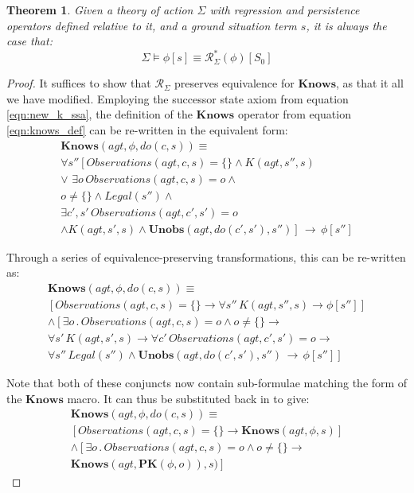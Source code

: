 \documentclass[letterpaper]{article}
\newtheorem{theorem}{Theorem}
\begin{document}
\begin{theorem}

Given a theory of action $\Sigma$ with regression and persistence
operators defined relative to it, and a ground situation term $s$,
it is always the case that:
\begin{equation}
\Sigma\models\phi[s]\equiv\mathcal{R}_{\Sigma}^{*}(\phi)[S_{0}]
\end{equation}

\end{theorem}

\begin{proof}

It suffices to show that $\mathcal{R}_{\Sigma}$ preserves equivalence
for $\mathbf{Knows}$, as that it all we have modified. Employing
the successor state axiom from equation \ref{eqn:new_k_ssa}, the
definition of the $\mathbf{Knows}$ operator from equation \ref{eqn:knows_def}
can be re-written in the equivalent form: \begin{multline*}
\mathbf{Knows}(agt,\phi,do(c,s))\equiv\\
\forall s''\left[Observations(agt,c,s)=\{\}\wedge K(agt,s'',s)\right.\\
\vee\,\,\exists o\, Observations(agt,c,s)=o\wedge\\
o\neq\{\}\wedge Legal(s'')\wedge\\
\exists c',s'\, Observations(agt,c',s')=o\\
\left.\wedge K(agt,s',s)\wedge\mathbf{Unobs}(agt,do(c',s'),s'')\right]\,\rightarrow\,\phi[s'']\end{multline*}


Through a series of equivalence-preserving transformations, this can
be re-written as: \begin{multline*}
\mathbf{Knows}(agt,\phi,do(c,s))\equiv\\
\left[Observations(agt,c,s)=\{\}\rightarrow\forall s''\, K(agt,s'',s)\rightarrow\phi[s'']\right]\\
\wedge\left[\exists o\,.\, Observations(agt,c,s)=o\wedge o\neq\{\}\rightarrow\right.\\
\forall s'\, K(agt,s',s)\rightarrow\forall c'\, Observations(agt,c',s')=o\rightarrow\\
\left.\forall s''\, Legal(s'')\wedge\mathbf{Unobs}(agt,do(c',s'),s'')\,\rightarrow\,\phi[s'']\right]\end{multline*}


Note that both of these conjuncts now contain sub-formulae matching
the form of the $\mathbf{Knows}$ macro. It can thus be substituted
back in to give: \begin{multline*}
\mathbf{Knows}(agt,\phi,do(c,s))\equiv\\
\left[Observations(agt,c,s)=\{\}\rightarrow\mathbf{Knows}(agt,\phi,s)\right]\\
\wedge\left[\exists o\,.\, Observations(agt,c,s)=o\wedge o\neq\{\}\rightarrow\right.\\
\left.\mathbf{Knows}(agt,\mathbf{PK}(\phi,o)),s)\right]\end{multline*}



\end{proof}
\end{document}
